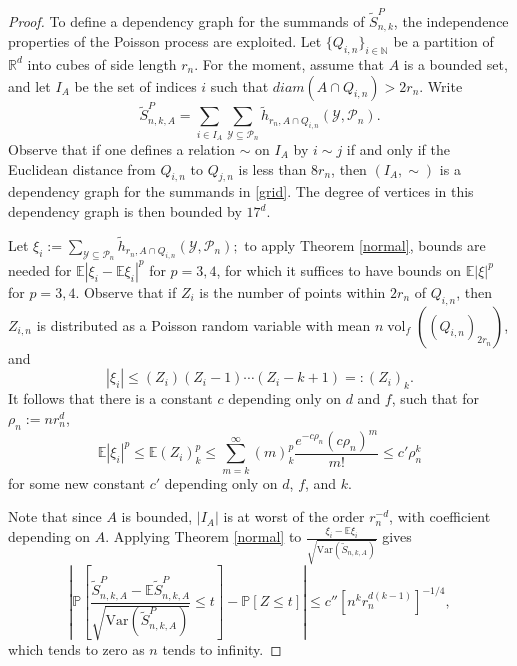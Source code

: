 \documentclass{amsart}
\theoremstyle{definition}
\newcommand{\R}{\mathbb{R}}
\newcommand{\E}{\mathbb{E}}
\newcommand{\N}{\mathbb{N}}
\newcommand{\vol}{\mathop{\mathrm{vol}}}
\newcommand{\Y}{\mathcal{Y}}
\renewcommand{\P}{\mathbb{P}}
\newcommand{\var}{\mathrm{Var}}
\newcommand{\s}{\widetilde{S}}
\newcommand{\p}{\mathcal{P}}
\renewcommand{\1}{\mathbb{1}}
\newcommand{\h}{\tilde{h}}
\begin{document}
\begin{proof}
To define a dependency graph 
for the summands of $\s_{n,k}^P$, the independence
properties of the Poisson process are exploited.  Let $\{Q_{i,n}\}_{i\in \N}$
be a partition of $\R^d$ into cubes of side length $r_n$.  For the moment, assume that $A$ is a bounded set, and let $I_A$ be the set of 
indices $i$ such that $diam(A\cap Q_{i,n})>2r_n$.  Write
 \begin{equation}\label{grid}
\s_{n,k,A}^P=\sum_{i\in I_A} \sum_{\Y\subseteq\p_n}\h_{r_n,A\cap Q_{i,n}}(\Y,\p_n).
\end{equation}
Observe that if one defines a relation $\sim$ on $I_A$ by $i\sim j$ if and
only if the Euclidean distance from $Q_{i,n}$ to $Q_{j,n}$ is 
less than
$8r_n$, then $(I_A,\sim)$ is a dependency graph for the summands in
\eqref{grid}.  The degree of vertices in this dependency graph is then
bounded by $17^d$.  

Let $\xi_i:=\sum_{\Y\subseteq\p_n}\h_{r_n,A\cap Q_{i,n}}(\Y,\p_n);$ to apply Theorem
\ref{normal}, bounds are needed for $\E|\xi_i-\E\xi_i|^p$ for $p=3,4$,
for which it suffices to have bounds on 
$\E|\xi|^p$ for $p=3,4$.  Observe that if $Z_{i}$ is the number of points 
within $2r_n$ of $Q_{i,n}$, then $Z_{i,n}$ is distributed as a Poisson 
random variable with mean $n\vol_f((Q_{i,n})_{2r_n})$, and 
$$|\xi_i|\le (Z_i)(Z_i-1)\cdots(Z_i-k+1)=:(Z_i)_k.$$
It follows that there is a constant $c$ depending only on $d$ and $f$, such
that for $\rho_n:=nr_n^d$, 
$$\E|\xi_i|^p\le\E (Z_i)_k^p\le\sum_{m=k}^\infty(m)_k^p\frac{e^{-c\rho_n}(c
\rho_n)^m}{m!}\le c'\rho_n^k$$
for some new constant $c'$ depending only on $d$, $f$, and $k$.


Note that since $A$ is bounded, 
$|I_A|$ is at worst of the order $r_n^{-d}$, with coefficient 
depending on 
$A$.  Applying Theorem \ref{normal} to $\frac{\xi_i-\E\xi_i}{\sqrt{\var(\s_{n,
k,A})}}$  gives
$$\left|\P\left[\frac{\s_{n,k,A}^P-\E \s_{n,k,A}^P}{\sqrt{\var(\s_{n,k,A}^P)}}
\le t\right]-\P[Z\le t]\right|\le c''[n^kr_n^{d(k-1)}]^{-1/4},$$
which tends to zero as $n$ tends to infinity.






\end{proof}
\end{document}
